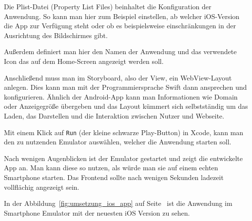 Die Plist-Datei (Property List Files) beinhaltet die Konfiguration der Anwendung. So kann man hier zum Beispiel
einstellen, ab welcher iOS-Version die App zur Verfügung steht oder ob es beispielsweise einschränkungen in der
Ausrichtung des Bildschirmes gibt.

Außerdem definiert man hier den Namen der Anwendung und das verwendete Icon das auf dem Home-Screen angezeigt werden
soll.

Anschließend muss man im Storyboard, also der View, ein WebView-Layout anlegen. Dies kann man mit der Programmiersprache
Swift dann ansprechen und konfigurieren. Ähnlich der Android-App kann man Informationen wie Domain oder Anzeigegröße
übergeben und das Layout kümmert sich selbstständig um das Laden, das Darstellen und die Interaktion zwischen Nutzer und
Webseite.

Mit einem Klick auf \texttt{Run} (der kleine schwarze Play-Button) in Xcode, kann man den zu nutzenden Emulator
auswählen, welcher die Anwendung starten soll.

Nach wenigen Augenblicken ist der Emulator gestartet und zeigt die entwickelte App an. Man kann diese so nutzen, als
würde man sie auf einem echten Smartphone starten. Das Frontend sollte nach wenigen Sekunden ladezeit vollflächig
angezeigt sein.

In der Abbildung~\ref{fig:umsetzung_ios_app} auf Seite~\pageref{fig:umsetzung_ios_app} ist die Anwendung im Smartphone
Emulator mit der neuesten iOS Version zu sehen.

